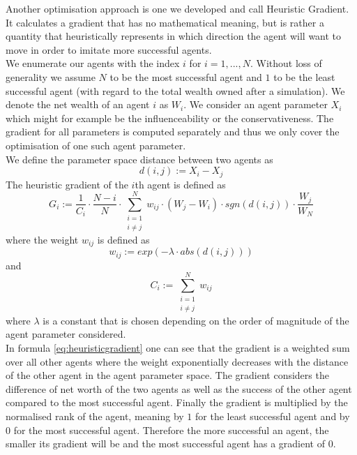 \documentclass[11pt]{article}
\begin{document}
Another optimisation approach is one we developed and call Heuristic Gradient. It calculates a gradient that has no mathematical meaning, but is rather a quantity that heuristically represents in which direction the agent will want to move in order to imitate more successful agents. \\
We enumerate our agents with the index $i$ for $i=1,...,N$. Without loss of generality we assume $N$ to be the most successful agent and $1$ to be the least successful agent (with regard to the total wealth owned after a simulation). We denote the net wealth of an agent $i$ as $W_i$. We consider an agent parameter $X_i$ which might for example be the influenceability or the conservativeness. The gradient for all parameters is computed separately and thus we only cover the optimisation of one such agent parameter. \\
We define the parameter space distance between two agents as
\begin{equation}
  d(i,j):=X_i-X_j
\end{equation}
The heuristic gradient of the $i$th agent is defined as \\
\begin{equation}\label{eq:heuristicgradient}
  G_i:=\frac{1}{C_i}\cdot \frac{N-i}{N} \cdot \sum\limits_{\substack{i=1 \\ i\neq j}}^{N}{ w_{ij} \cdot (W_j - W_i) \cdot sgn(d(i,j)) \cdot \frac{W_j}{W_N} }
\end{equation}
where the weight $w_{ij}$ is defined as
\begin{equation}
  w_{ij}:=exp(-\lambda \cdot abs(d(i,j)))
\end{equation}
and
\begin{equation}
  C_i:=\sum\limits_{\substack{i=1 \\ i\neq j}}^{N}{w_{ij}}
\end{equation}
where $\lambda$ is a constant that is chosen depending on the order of magnitude of the agent parameter considered. \\
In formula \ref{eq:heuristicgradient} one can see that the gradient is a weighted sum over all other agents where the weight exponentially decreases with the distance of the other agent in the agent parameter space. The gradient considers the difference of net worth of the two agents as well as the success of the other agent compared to the most successful agent. Finally the gradient is multiplied by the normalised rank of the agent, meaning by $1$ for the least successful agent and by $0$ for the most successful agent. Therefore the more successful an agent, the smaller its gradient will be and the most successful agent has a gradient of $0$. \\
\end{document}
